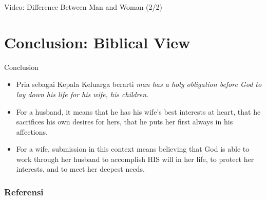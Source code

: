 \documentclass{beamer}
\theoremstyle{mystyle}
\begin{document}
\begin{frame}{Video: Difference Between Man and Woman (2/2)}
	\begin{center}
	\end{center}
\end{frame}

\section{Conclusion: Biblical View}
\begin{frame}{Conclusion}
	\begin{itemize}
		\item Pria sebagai Kepala Keluarga berarti \textit{man has a holy obligation before God to lay down his life for his wife, his children}.
		
		\bigskip		
				
		\item For a husband, it means that he has his wife's best interests at heart, that he sacrifices his own desires for hers, that he puts her first always in his affections. 
		
		\bigskip		
		
		\item For a wife, submission in this context means believing that God is able to work through her husband to accomplish HIS will in her life, to protect her interests, and to meet her deepest needs.
	\end{itemize}
\end{frame}



%
\begin{frame}[allowframebreaks]
  \frametitle<presentation>{\textbf{Referensi}}
    {\footnotesize
    
    
    }    
\end{frame}
\end{document}
